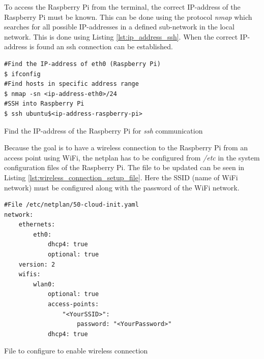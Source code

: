 \documentclass[../Head/report.tex]{subfiles}
\begin{document}
To access the Raspberry Pi from the terminal, the correct IP-address of the Raspberry Pi must be known. This can be done using the protocol \textit{nmap} which searches for all possible IP-addresses in a defined sub-network in the local network. This is done using Listing \ref{lst:ip_address_ssh}. When the correct IP-address is found an ssh connection can be established. 

\begin{listing}[H] 
\begin{tcolorbox}[
    enhanced,
    attach boxed title to top left={xshift=6mm,yshift=-3mm},
    colback=lightgreen!20,
    colframe=lightgreen,
    fonttitle=\bfseries\color{black},
]
\begin{verbatim}
#Find the IP-address of eth0 (Raspberry Pi) 
$ ifconfig	
#Find hosts in specific address range 
$ nmap -sn <ip-address-eth0>/24
#SSH into Raspberry Pi 
$ ssh ubuntu$<ip-address-raspberry-pi>
\end{verbatim}
\end{tcolorbox}
\caption{Find the IP-address of the Raspberry Pi for \textit{ssh} communication}
\label{lst:ip_address_ssh}    
\end{listing}  

Because the goal is to have a wireless connection to the Raspberry Pi from an access point using WiFi, the netplan has to be configured from \textit{/etc}  in the system configuration files of the Raspberry Pi. The file to be updated can be seen in Listing \ref{lst:wireless_connection_setup_file}. Here the SSID (name of WiFi network) must be configured along with the password of the WiFi network. 

\begin{listing}[H] 
\begin{tcolorbox}[
    enhanced,
    attach boxed title to top left={xshift=6mm,yshift=-3mm},
    colback=lightgreen!20,
    colframe=lightgreen,
    fonttitle=\bfseries\color{black},
]
\begin{verbatim}
#File /etc/netplan/50-cloud-init.yaml
network:
    ethernets:
        eth0:
            dhcp4: true
            optional: true
    version: 2
    wifis:
        wlan0:
            optional: true
            access-points:
                "<YourSSID>":
                    password: "<YourPassword>"
            dhcp4: true

\end{verbatim}
\end{tcolorbox}
\caption{File to configure to enable wireless connection}
\label{lst:wireless_connection_setup_file}    
\end{listing}  
\end{document}
